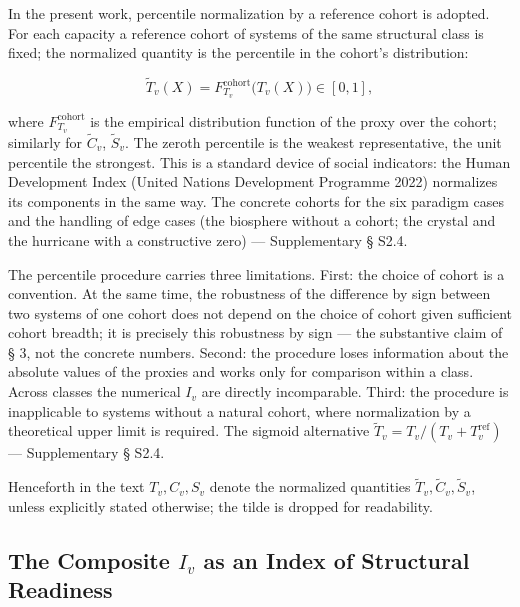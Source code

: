 \documentclass[pdflatex,sn-mathphys-ay]{sn-jnl}
\begin{document}
In the present work, percentile normalization by a reference cohort is adopted. For each capacity a reference cohort of systems of the same structural class is fixed; the normalized quantity is the percentile in the cohort's distribution:

\begin{equation}\tilde{T}_v(X) = F_{T_v}^{\text{cohort}}\bigl(T_v(X)\bigr) \in [0, 1], \tag{2a}\end{equation}

where \(F_{T_v}^{\text{cohort}}\) is the empirical distribution function of the proxy over the cohort; similarly for \(\tilde{C}_v\), \(\tilde{S}_v\). The zeroth percentile is the weakest representative, the unit percentile the strongest. This is a standard device of social indicators: the Human Development Index (United Nations Development Programme 2022) normalizes its components in the same way. The concrete cohorts for the six paradigm cases and the handling of edge cases (the biosphere without a cohort; the crystal and the hurricane with a constructive zero) --- Supplementary § S2.4.

The percentile procedure carries three limitations. First: the choice of cohort is a convention. At the same time, the robustness of the difference by sign between two systems of one cohort does not depend on the choice of cohort given sufficient cohort breadth; it is precisely this robustness by sign --- the substantive claim of § 3, not the concrete numbers. Second: the procedure loses information about the absolute values of the proxies and works only for comparison within a class. Across classes the numerical \(I_v\) are directly incomparable. Third: the procedure is inapplicable to systems without a natural cohort, where normalization by a theoretical upper limit is required. The sigmoid alternative \(\tilde{T}_v = T_v/(T_v + T_v^{\text{ref}})\) --- Supplementary § S2.4.

Henceforth in the text \(T_v, C_v, S_v\) denote the normalized quantities \(\tilde T_v, \tilde C_v, \tilde S_v\), unless explicitly stated otherwise; the tilde is dropped for readability.

\subsection{\texorpdfstring{The Composite \(I_v\) as an Index of Structural Readiness}{The Composite I\_v as an Index of Structural Readiness}}\label{the-composite-i_v-as-an-index-of-structural-readiness}
\end{document}
